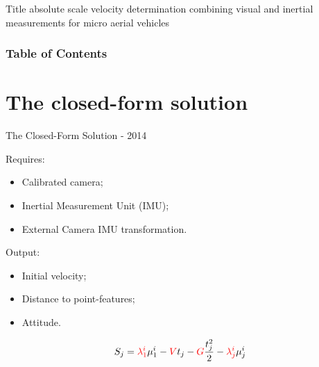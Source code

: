 \documentclass{beamer}
\begin{document}
\begin{frame}{Title}
absolute scale velocity determination combining visual and inertial measurements for micro aerial vehicles
\end{frame}


\begin{frame}
\frametitle{Table of Contents}
\tableofcontents
\end{frame}

\section{The closed-form solution}

\begin{frame}{The Closed-Form Solution - 2014}

Requires:
\begin{itemize}
\item Calibrated camera;
\item Inertial Measurement Unit (IMU);
\item External Camera IMU transformation.
\end{itemize}

Output:
\begin{itemize}
\item \alert<2->{Initial velocity};
\item \alert<2->{Distance to point-features};
\item Attitude.
\end{itemize}


\[
S_j = \textcolor{red}{\lambda_1^i}\mu_1^i - \textcolor{red}{V} t_j - \textcolor{red}{G} \frac{t_j^2}{2} - \textcolor{red}{\lambda^i_j} \mu^i_j
\]
\end{frame}
\end{document}

